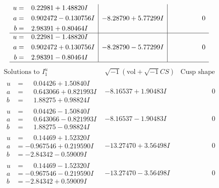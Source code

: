 \documentclass[1p]{elsarticle_modified}
\theoremstyle{definition}
\newcommand{\I}{\sqrt{-1}}
\begin{document}
$$\begin{array}{c|c|c}
\begin{aligned}
u &= \phantom{-}0.22981 + 1.48820 I \\
a &= \phantom{-}0.902472 - 0.130756 I \\
b &= \phantom{-}2.98391 + 0.80464 I\end{aligned}
 & -8.28790 + 5.77299 I & \phantom{-0.000000 } 0 \\ \hline\begin{aligned}
u &= \phantom{-}0.22981 - 1.48820 I \\
a &= \phantom{-}0.902472 + 0.130756 I \\
b &= \phantom{-}2.98391 - 0.80464 I\end{aligned}
 & -8.28790 - 5.77299 I & \phantom{-0.000000 } 0\\
 \hline 
 \end{array}$$\newpage$$\begin{array}{c|c|c}  
\text{Solutions to }I^u_{1}& \I (\text{vol} + \sqrt{-1}CS) & \text{Cusp shape}\\
 \hline 
\begin{aligned}
u &= \phantom{-}0.04426 + 1.50840 I \\
a &= \phantom{-}0.643066 + 0.821993 I \\
b &= \phantom{-}1.88275 + 0.98824 I\end{aligned}
 & -8.16537 + 1.90483 I & \phantom{-0.000000 } 0 \\ \hline\begin{aligned}
u &= \phantom{-}0.04426 - 1.50840 I \\
a &= \phantom{-}0.643066 - 0.821993 I \\
b &= \phantom{-}1.88275 - 0.98824 I\end{aligned}
 & -8.16537 - 1.90483 I & \phantom{-0.000000 } 0 \\ \hline\begin{aligned}
u &= \phantom{-}0.14469 + 1.52320 I \\
a &= -0.967546 + 0.219590 I \\
b &= -2.84342 - 0.59009 I\end{aligned}
 & -13.27470 + 3.56498 I & \phantom{-0.000000 } 0 \\ \hline\begin{aligned}
u &= \phantom{-}0.14469 - 1.52320 I \\
a &= -0.967546 - 0.219590 I \\
b &= -2.84342 + 0.59009 I\end{aligned}
 & -13.27470 - 3.56498 I & \phantom{-0.000000 } 0 \\ \hline\begin{aligned}

\end{aligned}
\end{array}$$
\end{document}
